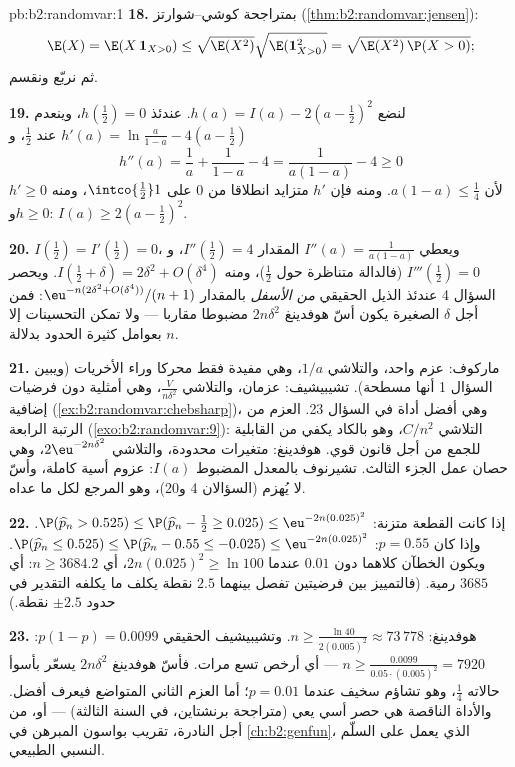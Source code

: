 \begin{solution}{pb:b2:randomvar:1}
\textbf{18.} بمتراجحة كوشي--شوارتز (\cref{thm:b2:randomvar:jensen}):
\[
\E(X) = \E(X\,\mathbf 1_{X>0})
\leq \sqrt{\E(X^2)}\sqrt{\E(\mathbf 1_{X>0}^2)}
= \sqrt{\E(X^2)\,\P(X > 0)} ;
\]
ثم نربّع ونقسم.

\textbf{19.} لنضع $h(a) = I(a) - 2(a - \tfrac12)^2$. عندئذ $h(\tfrac12) = 0$، وينعدم $h'(a) = \ln\frac a{1-a} - 4(a -
\tfrac12)$ عند $\tfrac12$، و
\[
h''(a) = \frac1a + \frac1{1-a} - 4 = \frac{1}{a(1-a)} - 4
\geq 0
\]
لأن $a(1-a) \leq \frac14$. ومنه فإن $h'$ متزايد انطلاقا من $0$ على $\intco{\frac12}1$،
ومنه $h' \geq 0$ و$h \geq 0$: $I(a)
\geq 2(a - \tfrac12)^2$.

\textbf{20.} $I(\tfrac12) = I'(\tfrac12) = 0$، ويعطي $I''(a) =
\frac1{a(1-a)}$ المقدار $I''(\tfrac12) = 4$، و$I'''(\tfrac12)
= 0$ (فالدالة
متناظرة حول $\tfrac12$)، ومنه $I(\tfrac12 + \delta) = 2\delta^2 + O(\delta^4)$. ويحصر السؤال 4 عندئذ الذيل
الحقيقي \emph{من الأسفل} بالمقدار $\eu^{-n(2\delta^2 + O(\delta^4))}/(n+1)$: فمن أجل $\delta$ الصغيرة
يكون أسّ هوفدينغ $2n\delta^2$ مضبوطا مقاربا --- ولا تمكن التحسينات إلا
بعوامل كثيرة الحدود بدلالة $n$.

\textbf{21.} ماركوف: عزم واحد، والتلاشي $1/a$، وهي مفيدة فقط
محركا وراء الأخريات (ويبين السؤال 1 أنها مسطحة). تشيبيشيف: عزمان،
والتلاشي $\frac{V}{n\delta^2}$، وهي أمثلية دون فرضيات إضافية (\cref{ex:b2:randomvar:chebsharp})، وهي أفضل
أداة في السؤال 23. العزم من الرتبة الرابعة (\cref{exo:b2:randomvar:9}): التلاشي $C/n^2$،
وهو بالكاد يكفي من القابلية للجمع من أجل قانون قوي. هوفدينغ:
متغيرات محدودة، والتلاشي $2\eu^{-2n\delta^2}$، وهي حصان عمل الجزء الثالث. تشيرنوف
بالمعدل المضبوط $I(a)$: عزوم أسية كاملة، وأسّ لا يُهزم (السؤالان 4
و20)، وهو المرجع لكل ما عداه.

\textbf{22.} إذا كانت القطعة متزنة: $\P(\widehat p_n > 0.525)
\leq \P(\widehat p_n - \tfrac12 \geq 0.025) \leq
\eu^{-2n(0.025)^2}$. وإذا كان $p = 0.55$:
$\P(\widehat p_n \leq
0.525) \leq \P(\widehat p_n - 0.55 \leq -0.025) \leq
\eu^{-2n(0.025)^2}$. ويكون الخطآن كلاهما دون $0.01$ عندما $2n(0.025)^2 \geq \ln 100$، أي $n \geq 3684.2$:
أي $3685$ رمية. (فالتمييز بين فرضيتين تفصل بينهما $2.5$ نقطة يكلف
ما يكلفه التقدير في حدود $\pm2.5$ نقطة.)

\textbf{23.} هوفدينغ: $n \geq \frac{\ln 40}{2(0.005)^2}
\approx 73\,778$. وتشيبيشيف  الحقيقي $p(1-p)
= 0.0099$:
$n \geq \frac{0.0099}{0.05\cdot(0.005)^2} =
7920$ --- أي أرخص تسع مرات. فأسّ هوفدينغ $2n\delta^2$ يسعّر 
بأسوأ حالاته $\frac14$، وهو تشاؤم سخيف عندما $p = 0.01$؛ أما العزم الثاني
المتواضع فيعرف أفضل. والأداة الناقصة هي حصر أسي يعي  (متراجحة
برنشتاين، في السنة الثالثة) --- أو، من أجل  النادرة، تقريب
بواسون المبرهن في \cref{ch:b2:genfun}، الذي يعمل على السلّم النسبي الطبيعي.


\end{solution}
